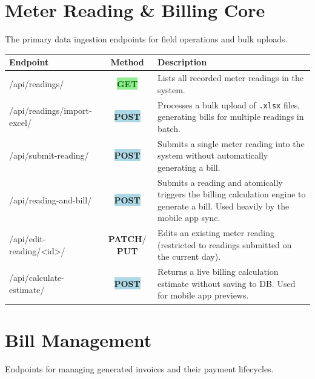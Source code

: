 \documentclass[12pt, a4paper]{report}
\newcommand{\httpget}{\colorbox{lightGreen}{\textcolor{darkGreen}{\textbf{\small GET}}}}
\newcommand{\httppost}{\colorbox{lightBlue}{\textcolor{deepBlue}{\textbf{\small POST}}}}
\newcommand{\httppatch}{\colorbox{warningBg}{\textcolor{accentAmber}{\textbf{\small PATCH}}}}
\newcommand{\httpput}{\colorbox{purple!10}{\textcolor{purple!70!black}{\textbf{\small PUT}}}}
\begin{document}
\section{Meter Reading \& Billing Core}
The primary data ingestion endpoints for field operations and bulk uploads.

\begin{table}[H]
\centering
\begin{tabularx}{\textwidth}{>{\ttfamily\raggedright\arraybackslash}p{} c X}
\toprule
\textbf{Endpoint} & \textbf{Method} & \textbf{Description} \\
\midrule
/api/readings/ & \httpget & Lists all recorded meter readings in the system. \\
/api/readings/import-excel/ & \httppost & Processes a bulk upload of \texttt{.xlsx} files, generating bills for multiple readings in batch. \\
/api/submit-reading/ & \httppost & Submits a single meter reading into the system without automatically generating a bill. \\
/api/reading-and-bill/ & \httppost & Submits a reading and atomically triggers the billing calculation engine to generate a bill. Used heavily by the mobile app sync. \\
/api/edit-reading/<id>/ & \httppatch / \httpput & Edits an existing meter reading (restricted to readings submitted on the current day). \\
/api/calculate-estimate/ & \httppost & Returns a live billing calculation estimate without saving to DB. Used for mobile app previews. \\
\bottomrule
\end{tabularx}
\end{table}

\section{Bill Management}
Endpoints for managing generated invoices and their payment lifecycles.
\end{document}
